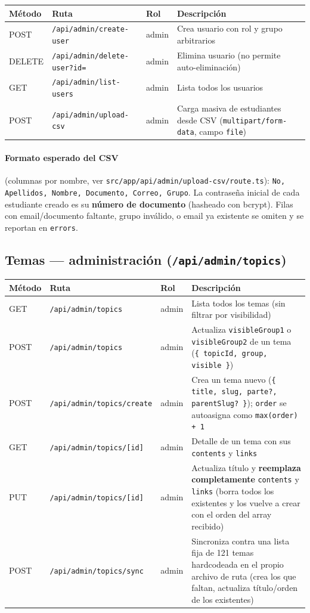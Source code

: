 \documentclass[11pt,a4paper]{article}
\newcommand{\code}[1]{\texttt{#1}}
\begin{document}
\begin{longtable}{@{}p{1.4cm}p{4.6cm}p{1.6cm}p{6.8cm}@{}}
\toprule
\textbf{Método} & \textbf{Ruta} & \textbf{Rol} & \textbf{Descripción} \\
\midrule
\endhead
POST & \code{/api/admin/create-user} & admin & Crea usuario con rol y grupo arbitrarios \\
DELETE & \code{/api/admin/delete-user?id=} & admin & Elimina usuario (no permite auto-eliminación) \\
GET & \code{/api/admin/list-users} & admin & Lista todos los usuarios \\
POST & \code{/api/admin/upload-csv} & admin & Carga masiva de estudiantes desde CSV (\code{multipart/form-data}, campo \code{file}) \\
\bottomrule
\end{longtable}

\paragraph{Formato esperado del CSV} (columnas por nombre, ver \code{src/app/api/admin/upload-csv/route.ts}):
\code{No, Apellidos, Nombre, Documento, Correo, Grupo}. La contraseña inicial de cada estudiante creado es su \textbf{número de documento} (hasheado con bcrypt). Filas con email/documento faltante, grupo inválido, o email ya existente se omiten y se reportan en \code{errors}.

\subsection{Temas --- administración (\code{/api/admin/topics})}

\begin{longtable}{@{}p{1.4cm}p{4.6cm}p{1.6cm}p{6.8cm}@{}}
\toprule
\textbf{Método} & \textbf{Ruta} & \textbf{Rol} & \textbf{Descripción} \\
\midrule
\endhead
GET & \code{/api/admin/topics} & admin & Lista todos los temas (sin filtrar por visibilidad) \\
POST & \code{/api/admin/topics} & admin & Actualiza \code{visibleGroup1} o \code{visibleGroup2} de un tema (\code{\{ topicId, group, visible \}}) \\
POST & \code{/api/admin/topics/create} & admin & Crea un tema nuevo (\code{\{ title, slug, parte?, parentSlug? \}}); \code{order} se autoasigna como \code{max(order) + 1} \\
GET & \code{/api/admin/topics/[id]} & admin & Detalle de un tema con sus \code{contents} y \code{links} \\
PUT & \code{/api/admin/topics/[id]} & admin & Actualiza título y \textbf{reemplaza completamente} \code{contents} y \code{links} (borra todos los existentes y los vuelve a crear con el orden del array recibido) \\
POST & \code{/api/admin/topics/sync} & admin & Sincroniza contra una lista fija de 121 temas hardcodeada en el propio archivo de ruta (crea los que faltan, actualiza título/orden de los existentes) \\
\bottomrule
\end{longtable}
\end{document}
